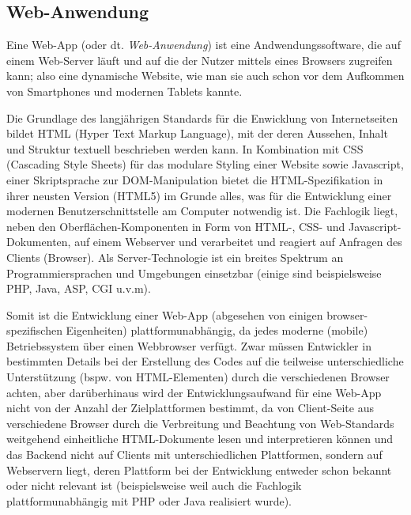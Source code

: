 \subsection{Web-Anwendung}

Eine Web-App (oder dt. \emph{Web-Anwendung}) ist eine Andwendungssoftware, die auf einem Web-Server läuft und auf die der Nutzer mittels eines Browsers zugreifen kann; also eine dynamische Website, wie man sie auch schon vor dem Aufkommen von Smartphones und modernen Tablets kannte. 

Die Grundlage des langjährigen Standards für die Enwicklung von Internetseiten bildet HTML (Hyper Text Markup Language), mit der deren Aussehen, Inhalt und Struktur textuell beschrieben werden kann. In Kombination mit CSS (Cascading Style Sheets) für das modulare Styling einer Website sowie Javascript, einer Skriptsprache zur DOM-Manipulation bietet die HTML-Spezifikation in ihrer neusten Version (HTML5) im Grunde alles, was für die Entwicklung einer modernen Benutzerschnittstelle am Computer notwendig ist. 
Die Fachlogik liegt, neben den Oberflächen-Komponenten in Form von HTML-, CSS- und Javascript-Dokumenten, auf einem Webserver und verarbeitet und reagiert auf Anfragen des Clients (Browser).
Als Server-Technologie ist ein breites Spektrum an Programmiersprachen und Umgebungen einsetzbar (einige sind beispielsweise PHP, Java, ASP, CGI u.v.m).

Somit ist die Entwicklung einer Web-App (abgesehen von einigen browser-spezifischen Eigenheiten) plattformunabhängig, da jedes moderne (mobile) Betriebssystem über einen Webbrowser verfügt. 
Zwar müssen Entwickler in bestimmten Details bei der Erstellung des Codes auf die teilweise unterschiedliche Unterstützung (bspw. von HTML-Elementen) durch die verschiedenen Browser achten, aber darüberhinaus wird der Entwicklungsaufwand für eine Web-App nicht von der Anzahl der Zielplattformen bestimmt, da von Client-Seite aus verschiedene Browser durch die Verbreitung und Beachtung von Web-Standards weitgehend einheitliche HTML-Dokumente lesen und interpretieren können und das Backend nicht auf Clients mit unterschiedlichen Plattformen, sondern auf Webservern liegt, deren Plattform bei der Entwicklung entweder schon bekannt oder nicht relevant ist (beispielsweise weil auch die Fachlogik plattformunabhängig mit PHP oder Java realisiert wurde).

